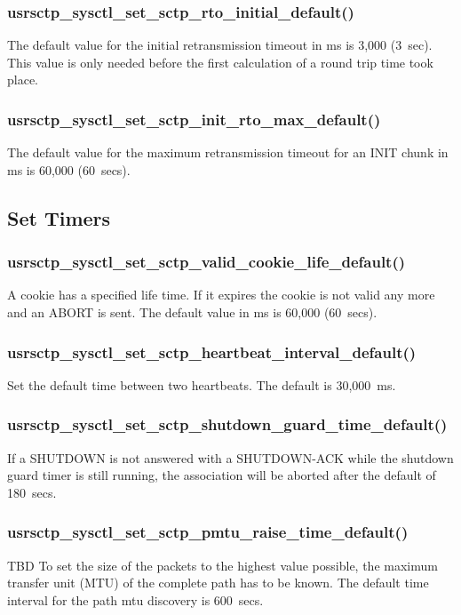 \documentclass[a4paper]{article}
\begin{document}
\subsubsection{usrsctp\_sysctl\_set\_sctp\_rto\_initial\_default()}
The default value for the initial retransmission timeout in ms is 3,000 (3~sec). This value is only
needed before the first calculation of a round trip time took place.

\subsubsection{usrsctp\_sysctl\_set\_sctp\_init\_rto\_max\_default()}
The default value for the maximum retransmission timeout for an INIT chunk in ms is 60,000 (60~secs). 


\subsection{Set Timers}
\subsubsection{usrsctp\_sysctl\_set\_sctp\_valid\_cookie\_life\_default()}
A cookie has a specified life time. If it expires the cookie is not valid any more and an ABORT is sent.
The default value in ms is 60,000 (60~secs).

\subsubsection{usrsctp\_sysctl\_set\_sctp\_heartbeat\_interval\_default()}
Set the default time between two heartbeats. The default is 30,000~ms.

\subsubsection{usrsctp\_sysctl\_set\_sctp\_shutdown\_guard\_time\_default()}
If a SHUTDOWN is not answered with a SHUTDOWN-ACK while the shutdown guard timer is still
running, the association will be aborted after the default of 180~secs.

\subsubsection{usrsctp\_sysctl\_set\_sctp\_pmtu\_raise\_time\_default()}
TBD
To set the size of the packets to the highest value possible, the maximum transfer unit (MTU)
of the complete path has to be known. The default time interval for the path mtu discovery
is 600~secs.
\end{document}
